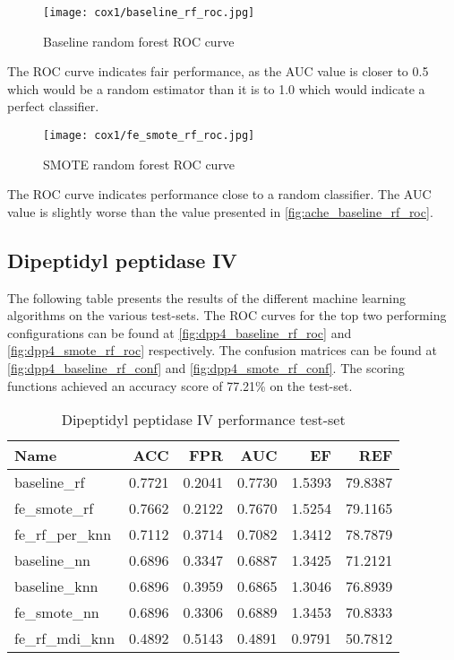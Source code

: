 \begin{figure}[H]
    \begin{center}
        \caption[]{Baseline random forest ROC curve}
        \label{fig:cox1_baseline_rf_roc}
        \texttt{[image: cox1/baseline\_rf\_roc.jpg]}
    \end{center}

\end{figure}
The ROC curve indicates fair performance, as the AUC value is closer to 0.5 which would be a random estimator than it is to 1.0 which would indicate a perfect classifier.

\begin{figure}[H]
    \begin{center}
        \caption[]{SMOTE random forest ROC curve}
        \label{fig:cox1_smote_rf_roc}
        \texttt{[image: cox1/fe\_smote\_rf\_roc.jpg]}
    \end{center}
\end{figure}
The ROC curve indicates performance close to a random classifier. The AUC value is slightly worse than the value presented in \ref*{fig:ache_baseline_rf_roc}.

\subsection{Dipeptidyl peptidase IV}
The following table presents the results of the different machine learning algorithms on the various
test-sets. The ROC curves for the top two performing configurations can be found at \ref{fig:dpp4_baseline_rf_roc} and \ref{fig:dpp4_smote_rf_roc}
respectively. The confusion matrices can be found at \ref{fig:dpp4_baseline_rf_conf} and \ref{fig:dpp4_smote_rf_conf}.
The scoring functions achieved an accuracy score of 77.21\% on the test-set.

\begin{table}[H]
    \begin{center}
        \caption{Dipeptidyl peptidase IV performance test-set}
        \begin{tabular}{lrrrrr}
            \toprule
            Name             & ACC    & FPR    & AUC    & EF     & REF     \\
            \midrule
            baseline\_rf     & 0.7721 & 0.2041 & 0.7730 & 1.5393 & 79.8387 \\
            fe\_smote\_rf    & 0.7662 & 0.2122 & 0.7670 & 1.5254 & 79.1165 \\
            fe\_rf\_per\_knn & 0.7112 & 0.3714 & 0.7082 & 1.3412 & 78.7879 \\
            baseline\_nn     & 0.6896 & 0.3347 & 0.6887 & 1.3425 & 71.2121 \\
            baseline\_knn    & 0.6896 & 0.3959 & 0.6865 & 1.3046 & 76.8939 \\
            fe\_smote\_nn    & 0.6896 & 0.3306 & 0.6889 & 1.3453 & 70.8333 \\
            fe\_rf\_mdi\_knn & 0.4892 & 0.5143 & 0.4891 & 0.9791 & 50.7812 \\
            \bottomrule
        \end{tabular}
    \end{center}
\end{table}

